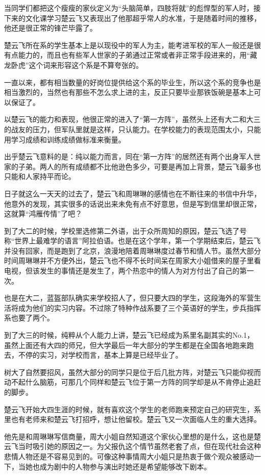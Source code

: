 当同学们都把这个瘦瘦的家伙定义为“头脑简单，四肢将就”的彪悍型的军人时，接下来的文化课学习楚云飞又表现出了他那超乎常人的水准，于是随着时间的推移，他还是很正常的锋芒毕露了。

楚云飞所在系的学生基本上是以现役中的军人为主，能考进军校的军人一般还是很有点能力的，而且也有些军人世家的子弟通过正常或者非正常手段进来的，用“藏龙卧虎”这个词来形容这个系是不算夸张的。

一直以来，都有相当数量的好岗位提供给这个系的毕业生，所以这个系的竞争也是相当激烈的，当然也有那些不怎么求上进的主，反正只要毕业那铁饭碗是基本上可以保证了。

以楚云飞的能力和表现，他很正常的进入了“第一方阵”，虽然头上还有大二和大三的战友的压力，但军队里就是这样，只认能力。在学校能力的表现范围太小，只能用学习成绩和训练成绩做标准来衡量。

出乎楚云飞意料的是：纯以能力而言，同在“第一方阵”的居然还有两个出身军人世家的子弟。两人的所有成绩都不比他逊色多少，可要是再加上背景，楚云飞最多也只能和人家持平而论。

日子就这么一天天的过去了，楚云飞和周琳琳的感情也在不断往来的书信中升华，他意外的发现，其实很多的话说出来未免有点不好意思，但是写到信里却很正常，这就算“鸿雁传情”了吧？

到了大二的时候，学校里选修第二外语，出于众所周知的原因，楚云飞选了号称“世界上最难学的语言”阿拉伯语。也是在这个学年，第一个学期结束后，楚云飞并没有回家，而是跑到了北京，浪漫地陪着周琳琳度过春节和情人节。虽然大部分时间周琳琳并不方便外出，楚云飞也不得不长时间呆在周家大小姐借来的屋子里看电视，但该发生的事情还是发生了，两个热恋中的情人为对方付出了自己的第一次。

也是在大二，蓝盔部队确实来学校招人了，但只要大四的学生，这段海外的军营生活将成为他们的实习内容。不过除了特种作战系要了三个英语好的学生，步兵指挥系也要了两个。

到了大三的时候，纯粹从个人能力上讲，楚云飞已经成为系里名副其实的No.1，虽然上面还有大四的师兄，但大学最后一年大部分的学生都是在全国各地跑来跑去，不停的实习，对学校而言，基本上算是已经毕业了。

树大了自然要招风，虽然大部分的同学只是位于后几批方阵，对楚云飞只能仰视而动不起什么脑筋，可那几个同样和楚云飞位于第一方阵的同学却是从不肯停止追赶的脚步。

楚云飞开始大四生涯的时候，就有喜欢这个学生的老师跑来预定自己的研究生，系里也有老师来和楚云飞打招呼，想让他留校。楚云飞又一次面临人生的重大选择。

他先是和周琳琳写信商量，周大小姐自然知道这个家伙心里想的是什么，这也是楚云飞当时吸引她的原因之一。为父报仇这个情节虽然老套了点，但在现代社会这种悲情人物还是不容易见到的。可像这种事情周大小姐只是热衷于做个观众被感动一下，当她也成为剧中的人物参与演出时她还是希望能够改下剧本。

